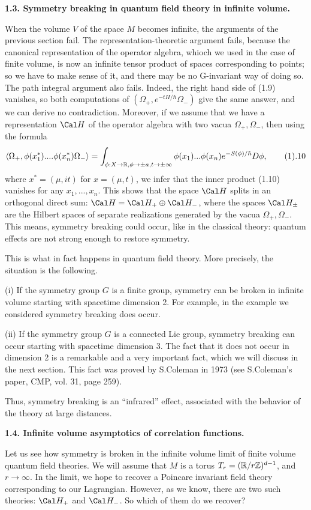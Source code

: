 {\bf 1.3. Symmetry breaking in quantum field theory in infinite volume.} 

When the volume $V$ of the space $M$ becomes infinite, the arguments 
of the previous section fail. The representation-theoretic argument fails,
because the canonical representation of the operator algebra, whioch we 
used in the case of finite volume, 
is now an infinite tensor product of spaces
corresponding to points; so we have to make sense of it, and there 
may be no G-invariant way of doing so. The path integral argument also fails.  
Indeed, the right hand side of (1.9)
vanishes, so both computations of $(\Omega_+,e^{-tH/\hbar}\Omega_-)$
give the same answer, and we can derive no contradiction. 
Moreover, if we assume that we have a representation $\Cal H$ of
the operator algebra with two vacua $\Omega_+,\Omega_-$, then 
using the formula
$$
\<\Omega_+,\phi(x_1^*)....\phi(x_n^*)\Omega_-\>=
\int_{\phi: X\to\R, \phi\to \pm a, t\to \pm\infty}
\phi(x_1)...\phi(x_n)e^{-S(\phi)/\hbar}D\phi,\tag 1.10 
$$
where $x^*=(\mu,it)$ for $x=(\mu,t)$,
we infer that the inner product (1.10)
vanishes for any $x_1,...,x_n$. This shows that the space
$\Cal H$ splits in an orthogonal direct sum: $\Cal H=\Cal H_+\oplus\Cal H_-$,
where the spaces $\Cal H_\pm$ are the Hilbert spaces
of separate realizations generated by the vacua
$\Omega_+,\Omega_-$. This means, symmetry breaking could occur, 
like in the classical theory: quantum effects are not strong enough 
to restore symmetry. 

This is what in fact happens in quantum field theory. 
More precisely, the situation is the following. 

(i) If the symmetry group $G$ is a finite group, symmetry
can be broken in infinite volume starting with spacetime dimension 2.
For example, in the example we considered symmetry breaking does occur. 

(ii) If the symmetry group $G$ is a connected Lie group, symmetry breaking 
can occur starting with spacetime dimension 3. The fact that it does not
occur in dimension 2 is a remarkable and a very important fact, which 
we will discuss in the next section. This fact was proved by S.Coleman 
in 1973 (see S.Coleman's paper, CMP, vol. 31, page 259).

Thus, symmetry breaking is an ``infrared'' effect, associated 
with the behavior of the theory at large distances. 

{\bf 1.4. Infinite volume asymptotics of correlation functions.}

Let us see how symmetry is broken in the infinite volume limit 
of finite volume quantum field theories. We will assume that 
$M$ is a torus $T_r=(\Bbb R/r\Bbb Z)^{d-1}$, and $r\to\infty$. 
In the limit, we hope
to recover a Poincare invariant field theory corresponding to our Lagrangian.
However, as we know, there are two such theories: $\Cal H_+$ and $\Cal H_-$. 
So which of them do we recover?

